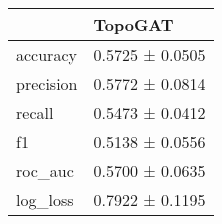 \begin{tabular}{ll}
\toprule
 & TopoGAT \\
\midrule
accuracy & 0.5725 ± 0.0505 \\
precision & 0.5772 ± 0.0814 \\
recall & 0.5473 ± 0.0412 \\
f1 & 0.5138 ± 0.0556 \\
roc_auc & 0.5700 ± 0.0635 \\
log_loss & 0.7922 ± 0.1195 \\
\bottomrule
\end{tabular}
